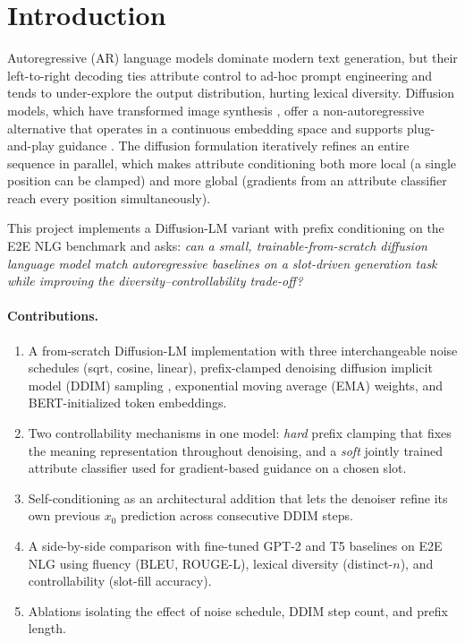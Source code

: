 \documentclass{llncs}
\begin{document}
\section{Introduction}
\label{sec:intro}

Autoregressive (AR) language models dominate modern text generation, but
their left-to-right decoding ties attribute control to ad-hoc prompt
engineering and tends to under-explore the output distribution, hurting
lexical diversity. Diffusion models, which have transformed image synthesis
\cite{ho2020ddpm,nichol2021improved}, offer a non-autoregressive alternative
that operates in a continuous embedding space and supports plug-and-play
guidance \cite{li2022diffusionlm}. The diffusion formulation iteratively
refines an entire sequence in parallel, which makes attribute conditioning
both more local (a single position can be clamped) and more global (gradients
from an attribute classifier reach every position simultaneously).

This project implements a Diffusion-LM variant with prefix conditioning on
the E2E NLG benchmark \cite{novikova2017e2e} and asks: \emph{can a small,
trainable-from-scratch diffusion language model match autoregressive
baselines on a slot-driven generation task while improving the
diversity--controllability trade-off?}

\paragraph{Contributions.}
\begin{enumerate}
  \item A from-scratch Diffusion-LM implementation with three interchangeable
        noise schedules (sqrt, cosine, linear), prefix-clamped denoising
        diffusion implicit model (DDIM) sampling \cite{song2021ddim},
        exponential moving average (EMA) weights, and BERT-initialized token
        embeddings.
  \item Two controllability mechanisms in one model: \emph{hard} prefix
        clamping that fixes the meaning representation throughout denoising,
        and a \emph{soft} jointly trained attribute classifier used for
        gradient-based guidance \cite{dhariwal2021guidance} on a chosen slot.
  \item Self-conditioning \cite{chen2022analog} as an architectural addition
        that lets the denoiser refine its own previous $x_0$ prediction
        across consecutive DDIM steps.
  \item A side-by-side comparison with fine-tuned GPT-2 and T5 baselines on
        E2E NLG using fluency (BLEU, ROUGE-L), lexical diversity
        (distinct-$n$), and controllability (slot-fill accuracy).
  \item Ablations isolating the effect of noise schedule, DDIM step count,
        and prefix length.
\end{enumerate}
\end{document}
